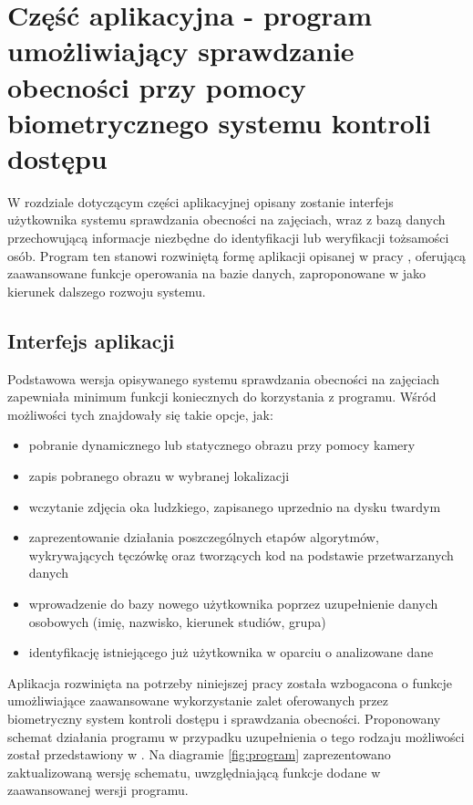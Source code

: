\chapter{Część aplikacyjna - program umożliwiający sprawdzanie obecności przy pomocy biometrycznego systemu kontroli dostępu}
\label{cha:systemKontroli}

W rozdziale dotyczącym części aplikacyjnej opisany zostanie interfejs użytkownika systemu sprawdzania obecności na zajęciach, wraz z bazą danych przechowującą informacje niezbędne do identyfikacji lub weryfikacji tożsamości osób. Program ten stanowi rozwiniętą formę aplikacji opisanej w pracy \cite{Gl11}, oferującą zaawansowane funkcje operowania na bazie danych, zaproponowane w \cite{Gl11} jako kierunek dalszego rozwoju systemu.

\section{Interfejs aplikacji}
\label{sec:aplikacja}

Podstawowa wersja opisywanego systemu sprawdzania obecności na zajęciach zapewniała minimum funkcji koniecznych do korzystania z programu. Wśród możliwości tych znajdowały się takie opcje, jak:
\begin{itemize}

\item pobranie dynamicznego lub statycznego obrazu przy pomocy kamery
\item zapis pobranego obrazu w wybranej lokalizacji
\item wczytanie zdjęcia oka ludzkiego, zapisanego uprzednio na dysku twardym
\item zaprezentowanie działania poszczególnych etapów algorytmów, wykrywających tęczówkę oraz tworzących kod na podstawie przetwarzanych danych
\item wprowadzenie do bazy nowego użytkownika poprzez uzupełnienie danych osobowych (imię, nazwisko, kierunek studiów, grupa)
\item identyfikację istniejącego już użytkownika w oparciu o analizowane dane

\end{itemize}
Aplikacja rozwinięta na potrzeby niniejszej pracy została wzbogacona o funkcje umożliwiające zaawansowane wykorzystanie zalet oferowanych przez biometryczny system kontroli dostępu i sprawdzania obecności. Proponowany schemat działania programu w przypadku uzupełnienia o tego rodzaju możliwości został przedstawiony w \cite{Gl11}. Na diagramie \ref{fig:program} zaprezentowano zaktualizowaną wersję schematu, uwzględniającą funkcje dodane w zaawansowanej wersji programu.

